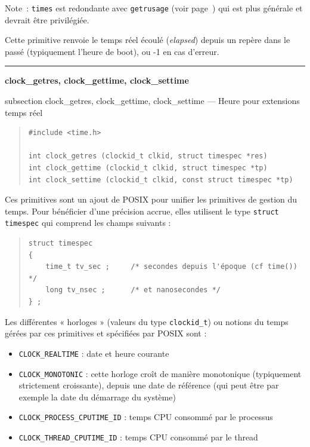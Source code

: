 \documentclass [twoside] {report}
\newcommand {\primitive} [1]
    {
	\phantomsection
	{\large \textbf {#1}}
	\addcontentsline {toc} {subsection} {#1}
    }
\newcommand {\separation}
    {
	\vspace {5mm}
	\nopagebreak
	\hrule
    }
\begin{document}
Note~: \texttt {times} est redondante avec \texttt {getrusage} (voir
page~\pageref {getrusage}) qui est plus générale et devrait être
privilégiée.

Cette primitive renvoie le temps réel écoulé (\textit {elapsed}) depuis un
repère dans le passé (typiquement l'heure de boot), ou -1 en cas
d'erreur.


\separation
\primitive {clock\_getres, clock\_gettime, clock\_settime} --- Heure pour extensions temps réel
    \label {clockgettime}

\begin {quote}
\begin {verbatim}
#include <time.h>

int clock_getres (clockid_t clkid, struct timespec *res)
int clock_gettime (clockid_t clkid, struct timespec *tp)
int clock_settime (clockid_t clkid, const struct timespec *tp)
\end{verbatim}
\end {quote}

Ces primitives sont un ajout de POSIX pour unifier les primitives de
gestion du temps. Pour bénéficier d'une précision accrue, elles
utilisent le type \texttt {struct timespec} qui comprend les champs
suivants :

\begin {quote}
    \small
\begin {verbatim}
struct timespec
{
    time_t tv_sec ;     /* secondes depuis l'époque (cf time()) */
    long tv_nsec ;      /* et nanosecondes */
} ;
\end{verbatim}
\end {quote}

Les différentes « horloges » (valeurs du type \verb|clockid_t|) ou
notions du temps gérées par ces primitives et spécifiées par POSIX
sont :

\begin {itemize}
    \item \texttt {CLOCK\_REALTIME} : date et heure courante
    \item \texttt {CLOCK\_MONOTONIC} : cette horloge croît de manière
	monotonique (typiquement strictement croissante), depuis une date
	de référence (qui peut être par exemple la date du démarrage
	du système)
    \item \texttt {CLOCK\_PROCESS\_CPUTIME\_ID} : temps CPU consommé par
	le processus
    \item \texttt {CLOCK\_THREAD\_CPUTIME\_ID} : temps CPU consommé par
	le thread
\end {itemize}
\end{document}
